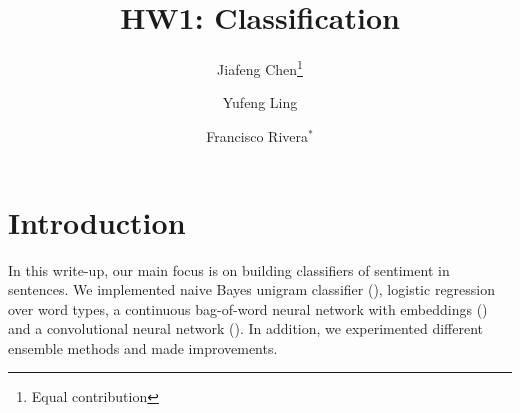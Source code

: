 \documentclass[11pt]{article}
\title{HW1: Classification}
\author{Jiafeng Chen\footnote{Equal contribution} \and Yufeng Ling \and
Francisco Rivera$^{*}$}
\begin{document}
\maketitle{}
\section{Introduction}




In this write-up, our main focus is on building classifiers of sentiment in sentences. We implemented naive Bayes unigram classifier (\cite{wang2012baselines}), logistic regression over word types, a continuous bag-of-word neural network with embeddings (\cite{mikolov2013efficient}) and a convolutional neural network (\cite{kim2014convolutional}). In addition, we experimented different ensemble methods and made improvements.


% 
% 
% 
% 
\end{document}
